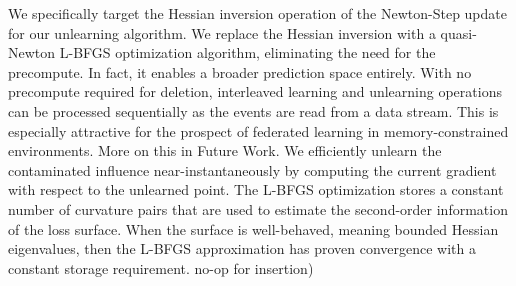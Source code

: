 \documentclass{article}
\theoremstyle{ssltheorem}
\begin{document}
We specifically target the Hessian inversion operation of the Newton-Step update for our unlearning algorithm.
We replace the Hessian inversion with a quasi-Newton L-BFGS optimization algorithm, eliminating the need for the precompute.
In fact, it enables a broader prediction space entirely. With no precompute required for deletion, interleaved learning and unlearning operations can be processed sequentially as the events are read from a data stream.
This is especially attractive for the prospect of federated learning in memory-constrained environments. More on this in Future Work.
We efficiently unlearn the contaminated influence near-instantaneously by computing the current gradient with respect to the unlearned point.
The L-BFGS optimization stores a constant number of curvature pairs that are used to estimate the second-order information of the loss surface.
When the surface is well-behaved, meaning bounded Hessian eigenvalues, then the L-BFGS approximation has proven convergence with a constant storage requirement.
no-op for insertion)
\end{document}
